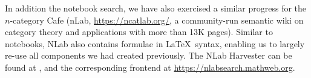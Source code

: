 In addition the notebook search, we have also exercised a similar progress for the $n$-category Cafe (nLab, \url{https://ncatlab.org/}, a community-run semantic wiki on category theory and applications with more than 13K pages). 
Similar to notebooks, NLab also contains formulae in \LaTeX\ syntax, enabling us to largely re-use all components we had created previously.  The NLab Harvester can be found at \cite{nlabharvester:github:on}, and the corresponding frontend at \url{https://nlabsearch.mathweb.org}.


